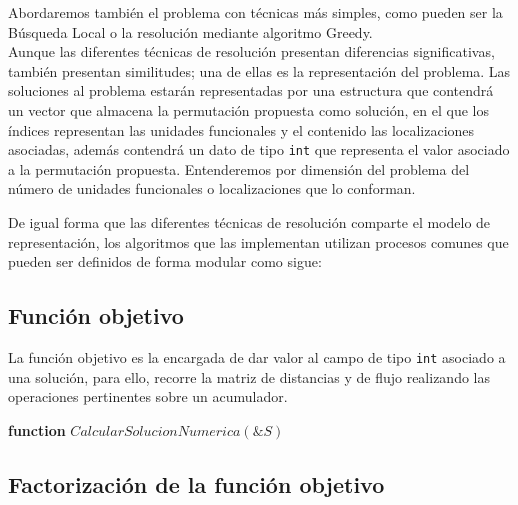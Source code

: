 \documentclass[11pt,a4paper]{article}
\begin{document}
	\noindent Abordaremos también el problema con técnicas más simples, como pueden ser la Búsqueda Local o la resolución mediante algoritmo Greedy.\\
	
	\noindent Aunque las diferentes técnicas de resolución presentan diferencias significativas, también presentan similitudes; una de ellas es la representación del problema. Las soluciones al problema estarán representadas por una estructura que contendrá un vector que almacena la permutación propuesta como solución, en el que los índices representan las unidades funcionales y el contenido las localizaciones asociadas, además contendrá un dato de tipo \texttt{int} que representa el valor asociado a la permutación propuesta. Entenderemos por dimensión del problema del número de unidades funcionales o localizaciones que lo conforman.
	
	\noindent De igual forma que las diferentes técnicas de resolución comparte el modelo de representación, los algoritmos que las implementan utilizan procesos comunes que pueden ser definidos de forma modular como sigue:
	
	\newpage
	
	\subsection{Función objetivo}
	
		\noindent La función objetivo es la encargada de dar valor al campo de tipo \texttt{int} asociado a una solución, para ello, recorre la matriz de distancias y de flujo realizando las operaciones pertinentes sobre un acumulador.
		
		\begin{algorithm}
			\textbf{function} $CalcularSolucionNumerica(\&S)$
			
		\end{algorithm}
	
	\subsection{Factorización de la función objetivo}
	
\end{document}
